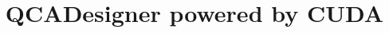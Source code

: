 \documentclass[a4paper,12pt]{report}
\begin{document}
\title{QCADesigner powered by CUDA}

\providecommand{\primoautore}{Gibilisco~\sc{Giovanni Paolo}}               
\providecommand{\primamatricola}{755066}            
\providecommand{\secondoautore}{Marconi~\sc{Francesco}}
\providecommand{\secondamatricola}{755439}
\providecommand{\terzoautore}{Miglierina~\sc{Marco}}
\providecommand{\terzamatricola}{754848}
\providecommand{\instructor}{Prof.ssa Sciuto~\sc{Donatella}}  
\providecommand{\tutor}{Santambrogio~\sc{Marco Domenico}}
\providecommand{\annoacc}{2009-2010}

\titlfp

\titlepage

\headsep 2cm

\setlength{\headwidth}{\textwidth}
  \fancyhead[R]{}


	\fancyfoot[C]{\thepage}
	\renewcommand{\footrulewidth}{0.4pt}

\newpage

\tableofcontents

\newpage

\listoffigures





\newpage


\newpage


\newpage


\newpage



\newpage



\newpage



\newpage




\end{document}
